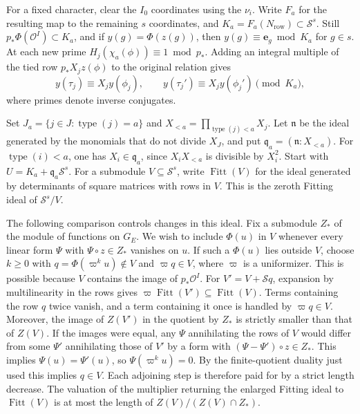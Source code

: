 For a fixed character, clear the \(I_0\) coordinates using the \(\nu_i\).
Write \(F_a\) for the resulting map to the remaining \(s\) coordinates,
and \(K_a=F_a(N_\mathrm{row})\subset\mathcal S^s\). Still
\(p_\ast\Phi(\mathcal O^I)\subset K_a\), and if \(y(g)=\Phi(z(g))\),
then \(y(g)\equiv\mathbf e_g\bmod K_a\) for \(g\in s\).
At each new prime \(H_j(\chi_a(\phi))\equiv1\bmod p_\ast\).
Adding an integral multiple of the tied row \(p_\ast X_j z(\phi)\)
to the original relation gives
\[
 y(\tau_j)\equiv X_j y(\phi_j),\qquad
 y(\tau_j')\equiv X_j y(\phi_j')\pmod{K_a},
\]
where primes denote inverse conjugates.

Set \(J_a=\{j\in J:\operatorname{type}(j)=a\}\) and
\(X_{<a}=\prod_{\operatorname{type}(j)<a}X_j\).
Let \(\mathfrak n\) be the ideal generated by the monomials that
do not divide \(X_J\), and put \(\mathfrak q_a=(\mathfrak n:X_{<a})\).
For \(\operatorname{type}(i)<a\), one has \(X_i\in\mathfrak q_a\),
since \(X_iX_{<a}\) is divisible by \(X_i^2\).
Start with \(U=K_a+\mathfrak q_a\mathcal S^s\).
For a submodule \(V\subseteq\mathcal S^s\), write
\(\operatorname{Fitt}(V)\) for the ideal generated by determinants
of square matrices with rows in \(V\).
This is the zeroth Fitting ideal of \(\mathcal S^s/V\).

The following comparison controls changes in this ideal.
Fix a submodule \(Z_*\) of the module of functions on \(G_E\).
We wish to include \(\Phi(u)\) in \(V\) whenever every linear form
\(\Psi\) with \(\Psi\circ z\in Z_*\) vanishes on \(u\).
If such a \(\Phi(u)\) lies outside \(V\), choose \(k\ge0\) with
\(q=\Phi(\varpi^k u)\notin V\) and \(\varpi q\in V\), where
\(\varpi\) is a uniformizer. This is possible because \(V\)
contains the image of \(p_\ast\mathcal O^I\).
For \(V'=V+\mathcal S q\), expansion by multilinearity in the rows
gives \(\varpi\operatorname{Fitt}(V')\subseteq\operatorname{Fitt}(V)\).
Terms containing the row \(q\) twice vanish, and a term containing it
once is handled by \(\varpi q\in V\). Moreover, the image of \(Z(V')\)
in the quotient by \(Z_*\) is strictly smaller than that of \(Z(V)\).
If the images were equal, any \(\Psi\) annihilating the rows of \(V\)
would differ from some \(\Psi'\) annihilating those of \(V'\) by a
form with \((\Psi-\Psi')\circ z\in Z_*\).
This implies \(\Psi(u)=\Psi'(u)\), so \(\Psi(\varpi^k u)=0\).
By the finite-quotient duality just used this implies \(q\in V\).
Each adjoining step is therefore paid for by a strict length
decrease. The valuation of the multiplier returning the enlarged
Fitting ideal to \(\operatorname{Fitt}(V)\) is at most the length
of \(Z(V)/(Z(V)\cap Z_*)\).


